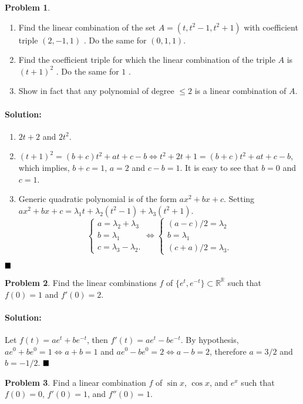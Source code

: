 \documentclass[]{article}
\newcommand{\RR}{\mathbb{R}}
\theoremstyle{definition}
\newtheorem{problem}{Problem}
\newenvironment{solution}{\paragraph{Solution:}}{\hfill$\blacksquare \\$}
\begin{document}
\begin{problem}
	\begin{enumerate}[label = (\alph*)]
		\item Find the linear combination of the set  $A = (t,t^2-1,t^2+1)$ with coefficient triple  $(2,-1,1)$    . Do the same for  $(0,1,1)$.  	
		\item Find the coefficient triple for which the linear combination of the triple  $A$  is  $(t+1)^2$  . Do the same for  $1$  .
		\item Show in fact that any polynomial of degree  $\leq 2$ is a linear combination of $A$.  
	\end{enumerate}
\end{problem}
\begin{solution}
\begin{enumerate}[label = (\alph*)]
	\item
		$2t +2$ and $2t^2$.
	\item
		$(t+1)^2 = (b+c)t^2+ at + c-b \Leftrightarrow t^2+2t+1 = (b+c)t^2 + at + c-b$, which implies, $b+c=1$, $a=2$ and $c-b=1$. It is easy to see that $b=0$ and $c=1$.
	\item
		Generic quadratic polynomial is of the form $ax^2 + bx + c$. Setting $ax^2+bx+c = \lambda_1 t + \lambda_2 (t^2-1) + \lambda_3(t^2+1)$.
		\[	
		\begin{cases}
			a = \lambda_2 + \lambda_3 \\
			b = \lambda_1 \\
			c = \lambda_3 - \lambda_2.
		\end{cases}
		\Leftrightarrow
		\begin{cases}
			(a-c)/2 = \lambda_2 \\
			b = \lambda_1 \\
			(c + a)/2 = \lambda_3.
		\end{cases}
		\]
		\end{enumerate}
\end{solution}
\begin{problem}
	Find the linear combinations  $f$  of $ \{e^t , e^{-t} \} \subset \RR^\RR$ such that  $f(0) = 1$ and  $f'(0)=2$.
\end{problem}
\begin{solution}
	Let $f(t) = ae^t+be^{-t}$, then $f'(t) = ae^t-be^{-t}$. By hypothesis, $ae^0+be^0 = 1 \Leftrightarrow a+b=1$ and $ae^0-be^0 = 2 \Leftrightarrow a-b=2$, therefore $a = 3/2$ and $b=-1/2$.
\end{solution}
\begin{problem}
	Find a linear combination  $f$  of  $\sin x$,  $\cos x$, and  $e^x$  such that  $f(0)=0$,  $f'(0) = 1$, and  $  f''(0) = 1$.	
\end{problem}
\end{document}
